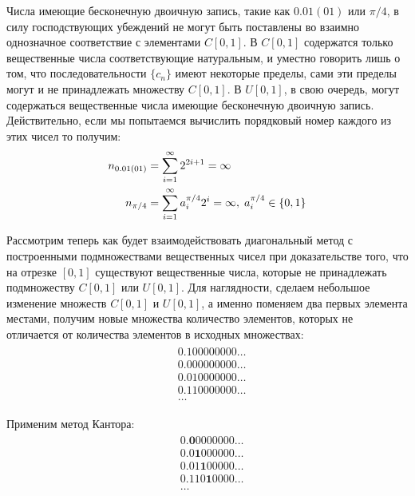 \documentclass[12pt]{article}
\begin{document}
Числа имеющие бесконечную двоичную запись, такие как $0.01(01)$ или $\pi/4$, в силу господствующих убеждений не могут быть поставлены во взаимно однозначное соответствие с элементами $C[0, 1]$. В $C[0, 1]$ содержатся только вещественные числа соответствующие натуральным, и уместно говорить лишь о том, что последовательности $\{c_n\}$ имеют некоторые пределы, сами эти пределы могут и не принадлежать множеству $C[0, 1]$. В $U[0, 1]$, в свою очередь, могут содержаться вещественные числа имеющие бесконечную двоичную запись. Действительно, если мы попытаемся вычислить порядковый номер каждого из этих чисел то получим:
\begin{align}
\begin{split}
n_{0.01(01)} &= \sum_{i=1}^{\infty} 2^{2i+1} = \infty\\
n_{\pi/4} &= \sum_{i=1}^{\infty} a_i^{\pi/4}2^{i} = \infty,\thickspace a_i^{\pi/4} \in \{0, 1\}
\end{split}
\end{align}

Рассмотрим теперь как будет взаимодействовать диагональный метод с построенными подмножествами вещественных чисел при доказательстве того, что на отрезке $[0, 1]$ существуют вещественные числа, которые не принадлежать подмножеству $C[0, 1]$ или $U[0, 1]$. Для наглядности, сделаем небольшое изменение множеств $C[0, 1]$ и $U[0, 1]$, а именно поменяем два первых элемента местами, получим новые множества количество элементов, которых не отличается от количества элементов в исходных множествах:
\begin{align}
\begin{split}
&0.100000000\dots\\
&0.000000000\dots\\
&0.010000000\dots\\
&0.110000000\dots\\
&\dots
\end{split}
\end{align}

Применим метод Кантора:
\begin{align}
\begin{split}
&0.\textbf{0}0000000\dots\\
&0.0\textbf{1}000000\dots\\
&0.01\textbf{1}00000\dots\\
&0.110\textbf{1}0000\dots\\
&\dots
\end{split}
\end{align}
\end{document}
